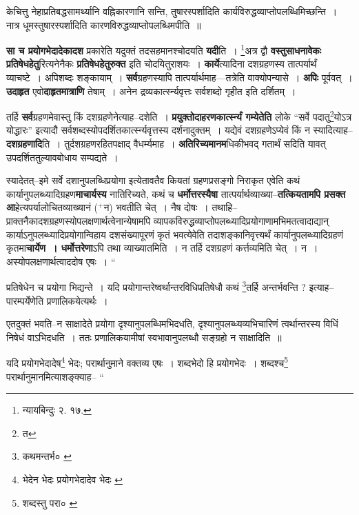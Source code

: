 \documentclass[article,12pt,a4paper]{memoir}
\newcommand{\add}[1]{($^{+}$#1)}
\begin{document}
	  \endgroup
	

	  \pstart केचित्तु नेहाप्रतिबद्धसामर्थ्यानि वह्निकारणानि सन्ति, तुषारस्पर्शादिति कार्यविरुद्धव्याप्तोपलब्धिमिच्छन्ति । नात्र धूमस्तुषारस्पर्शादिति कारणविरुद्धव्याप्तोपलब्धिमपीति ॥
	\pend
      

	  \pstart \textbf{सा च प्रयोगभेदादेकादश} प्रकारेति यदुक्तं तदसहमानश्चोदयति \textbf{यदी}ति । \footnote{न्यायबिन्दुः २. १७.}\-अत्र द्वौ \textbf{वस्तुसाधनावेकः प्रतिषेधहेतु}रित्यनेनैकः \textbf{प्रतिषेधहेतुरुक्त} इति चोदयितुराशयः । \textbf{कार्ये}त्यादिना दशग्रहणस्य तात्पर्यार्थं व्याचष्टे । अपिशब्दः शङ्कायाम् । \textbf{सर्व}ग्रहणस्यापि तात्पर्यार्थमाह—तत्रेति वाक्योपन्यासे । \textbf{अपिः} पूर्ववत् । \textbf{उदाहृत} एवो\textbf{दाहृतमात्राणि} तेषाम् । अनेन द्रव्यकार्त्स्न्यवृत्तः सर्वशब्दो गृहीत इति दर्शितम् ।
	\pend
      

	  \pstart तर्हि \leavevmode{} \textbf{सर्व}ग्रहणमेवास्तु किं दशग्रहणेनेत्याह--दशेति । \textbf{प्रयुक्तोदाहरणकार्त्स्न्यं गम्येतेति} लोके “सर्वे पदातु\footnote{त}\-योऽत्र योद्धारः” इत्यादौ सर्वशब्दस्योपदर्शितकार्त्स्न्यवृत्तस्य दर्शनादुक्तम् । यद्येवं दशग्रहणेऽप्येवं किं न स्यादित्याह--\textbf{दशग्रहणादि}ति । तुर्दशग्रहणरहितपक्षाद् वैधर्म्यमाह । \textbf{अतिरिच्यमानम}धिकीभवद् गतार्थं सदिति यावत् उपदर्शिततुल्यावबोधाय सम्पद्यते ।
	\pend
      

	  \pstart स्यादेतत्--इमे सर्वे दशानुपलब्धिप्रयोगा इत्येतावतैव कियतां ग्रहणप्रसङ्गो निराकृत एवेति कथं कार्यानुपलब्ध्यादिग्रहण\textbf{माचार्यस्य} नातिरिच्यते, कथं च \textbf{धर्मोत्तरस्यैषा} तात्पर्यार्थव्याख्या--\textbf{तत्कियतामपि प्रसक्त आ}हेत्यपर्यालोचितव्याख्यानं \add{न} भवतीति चेत् । नैष दोषः । तथाहि--प्राक्तनैकादशग्रहणस्योपलक्षणार्थत्वेनान्येषामपि व्यापकविरुद्धव्याप्तोपलब्ध्यादिप्रयोगाणामभिमतत्वादाद्यान् कार्याऽनुपलब्ध्यादिप्रयोगान्विहाय दशसंख्यापूरणं कृतं भवत्येवेति तदाशङ्कानिवृत्त्यर्थं कार्यानुपलब्ध्यादिग्रहणं कृतमा\textbf{चार्येण । धर्मोत्तरेणा}ऽपि तथा व्याख्यातमिति । न तर्हि दशग्रहणं कर्त्तव्यमिति चेत् । न । अस्योपलक्षणार्थत्वाददोष एषः ।  \leavevmode{} “
	  
	प्रतिषेधेन च प्रयोगा भिद्यन्ते । यदि प्रयोगान्तरेष्वर्थान्तरविधिप्रतिषेधौ कथं \footnote{कथमन्तर्भ० \cite{dp-msC}}\-तर्हि अन्तर्भवन्ति ? इत्याह--पारम्पर्येणेति प्रणालिकयेत्यर्थः । 
	  
	एतदुक्तं भवति--न साक्षादेते प्रयोगा दृश्यानुपलब्धिमभिदधति, दृश्यानुपलब्ध्यव्यभिचारिणं त्वर्थान्तरस्य विधिं निषेधं वाऽभिदधति । ततः प्रणालिकयामीषां स्वभावानुपलब्धौ सङ्ग्रहो न साक्षादिति ॥ 
	  
	यदि प्रयोगभेदादेष\footnote{भेदेन भेदः \cite{dp-msA} \cite{dp-edP} \cite{dp-edH} \cite{dp-edE} \cite{dp-edN} प्रयोगभेदादेव भेदः \cite{dp-msB} \cite{dp-msC}} भेदः; परार्थानुमाने वक्तव्य एषः । शब्दभेदो हि प्रयोगभेदः । शब्दश्च\footnote{शब्दस्तु परा० \cite{dp-msB} \cite{dp-msC}} परार्थानुमानमित्याशङ्क्याह-- “
	  
\end{document}
